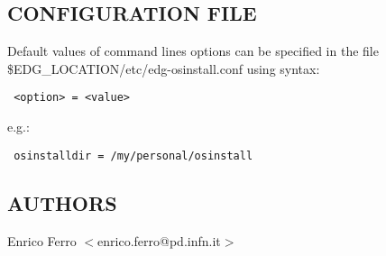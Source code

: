 \subsection*{CONFIGURATION FILE\label{edg-osinstall_CONFIGURATION_FILE}}


Default values of command lines options can be specified in the file
\$EDG\_LOCATION/etc/edg-osinstall.conf using syntax:

\begin{verbatim}
 <option> = <value>
\end{verbatim}


e.g.:

\begin{verbatim}
 osinstalldir = /my/personal/osinstall
\end{verbatim}
\subsection*{AUTHORS\label{edg-osinstall_AUTHORS}}


Enrico Ferro $<$enrico.ferro@pd.infn.it$>$

